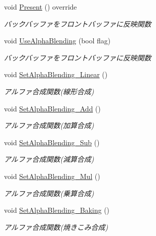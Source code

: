 \begin{DoxyCompactItemize}
void \mbox{\hyperlink{class_renderer_direct_x9_a77dbc76e8adbe4f9ee41c5f09e5ebe81}{Present}} () override
\begin{DoxyCompactList}\small\item\em バックバッファをフロントバッファに反映関数 \end{DoxyCompactList}\item 
void \mbox{\hyperlink{class_renderer_direct_x9_aa555dda63bdc0f4dfc28ac506d6e8d60}{Use\+Alpha\+Blending}} (bool flag)
\begin{DoxyCompactList}\small\item\em バックバッファをフロントバッファに反映関数 \end{DoxyCompactList}\item 
void \mbox{\hyperlink{class_renderer_direct_x9_abfb5264cbb0bf3bacc7b4ec416ddc05a}{Set\+Alpha\+Blending\+\_\+\+Linear}} ()
\begin{DoxyCompactList}\small\item\em アルファ合成関数(線形合成) \end{DoxyCompactList}\item 
void \mbox{\hyperlink{class_renderer_direct_x9_aa552107a3d5f8a61347fe10741fd04a3}{Set\+Alpha\+Blending\+\_\+\+Add}} ()
\begin{DoxyCompactList}\small\item\em アルファ合成関数(加算合成) \end{DoxyCompactList}\item 
void \mbox{\hyperlink{class_renderer_direct_x9_a6ddbb9f801ef6b2c86ec5cd4e97b317b}{Set\+Alpha\+Blending\+\_\+\+Sub}} ()
\begin{DoxyCompactList}\small\item\em アルファ合成関数(減算合成) \end{DoxyCompactList}\item 
void \mbox{\hyperlink{class_renderer_direct_x9_a75dbeaa680610e655c6ff202591f50d7}{Set\+Alpha\+Blending\+\_\+\+Mul}} ()
\begin{DoxyCompactList}\small\item\em アルファ合成関数(乗算合成) \end{DoxyCompactList}\item 
void \mbox{\hyperlink{class_renderer_direct_x9_a083f55d941075227189769fd9807ffd1}{Set\+Alpha\+Blending\+\_\+\+Baking}} ()
\begin{DoxyCompactList}\small\item\em アルファ合成関数(焼きこみ合成) \end{DoxyCompactList}\item 

\end{DoxyCompactItemize}
